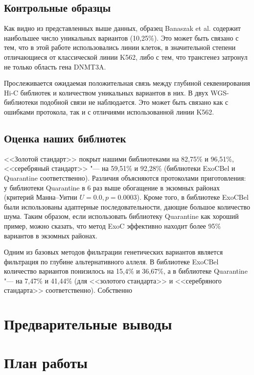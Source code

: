 \documentclass[a4paper,12pt]{article}
\begin{document}
\subsection{Контрольные образцы}

Как видно из представленных выше данных, образец Banaszak et al. содержит наибольшее число уникальных вариантов (10,25\%).
Это может быть связано с тем, что в этой работе использовались линии клеток, в значительной степени отличающиеся от классической линии K562, либо с тем, что трансгенез затронул не только область гена DNMT3A.

Прослеживается ожидаемая положительная связь между глубиной секвенирования Hi-C библиотек и количеством уникальных вариантов в них.
В двух WGS-библиотеки подобной связи не наблюдается.
Это может быть связано как с ошибками протокола, так и с отличиями использованной линии K562.

\subsection{Оценка наших библиотек}

<<Золотой стандарт>> покрыт нашими библиотеками на 82,75\% и 96,51\%, <<серебряный стандарт>> "--- на 59,51\% и 92,28\% (библиотеки ExoCBel и Quarantine соответственно).
Различия объясняются протоколами приготовления: у библиотеки Quarantine в 6 раз выше обогащение в экзомных районах (критерий Манна--Уитни $U = 0.0, p = 0.0003$).
Кроме того, в библиотеке ExoCBel были использованы адаптерные последовательности, дающие большое количество шума.
Таким образом, если использовать библиотеку Quarantine как хороший пример, можно сказать, что метод ExoC эффективно находит более 95\% вариантов в экзомных районах.

Одним из базовых методов фильтрации генетических вариантов является фильтрация по глубине альтернативного аллеля.
В библиотеке ExoCBel количество вариантов понизилось на 15,4\% и 36,67\%, а в библиотеке  Quarantine "--- на 7,47\% и 41,44\% (для <<золотого стандарта>> и <<серебряного стандарта>> соответственно).
Собственно

\section{Предварительные выводы}

\section{План работы}
\end{document}
